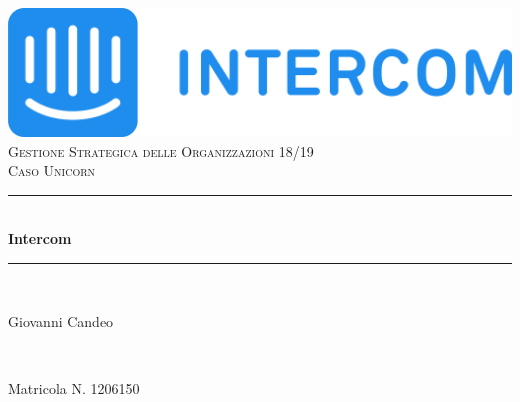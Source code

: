 \documentclass[a4paper, 11pt]{article}
\begin{document}

\begin{titlepage}
	\centering
    \vspace*{0.5 cm}
    \includegraphics[width=0.7\linewidth]{images/intercomsvg.png}\\[1.0 cm]
    \textsc{\LARGE Gestione Strategica delle Organizzazioni 18/19}\\[2.0 cm]
	\textsc{\Large Caso Unicorn}\\[0.5 cm]				
	\rule{\linewidth}{0.2 mm} \\[0.4 cm]
	{ \huge \bfseries Intercom}\\
	\rule{\linewidth}{0.2 mm} \\[1.5 cm]
	
	\begin{minipage}{0.4\textwidth}
		\begin{flushleft} \large
			Giovanni Candeo\\
		\end{flushleft}
		\end{minipage}~
		\begin{minipage}{0.4\textwidth}
            
		\begin{flushright} \large
            Matricola N. 1206150\\
		\end{flushright}
        
	\end{minipage}\\[2 cm]
	
\end{titlepage}

\end{document}
